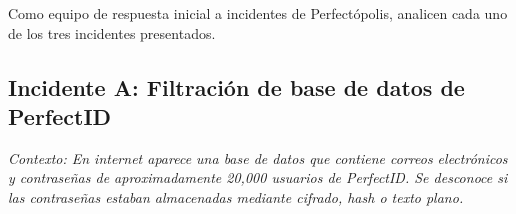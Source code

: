 
Como equipo de respuesta inicial a incidentes de Perfectópolis, analicen cada uno de los tres incidentes presentados.

\subsection*{Incidente A: Filtración de base de datos de PerfectID}
\textit{Contexto: En internet aparece una base de datos que contiene correos electrónicos y contraseñas de aproximadamente 20,000 usuarios de PerfectID. Se desconoce si las contraseñas estaban almacenadas mediante cifrado, hash o texto plano.}

